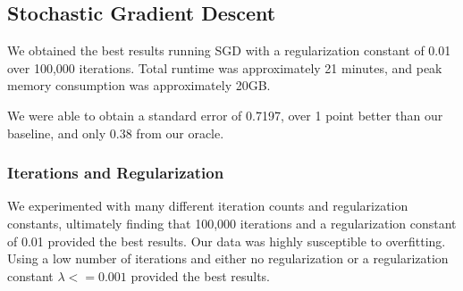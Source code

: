 \documentclass[journal]{IEEEtran}
\begin{document}
\subsection{Stochastic Gradient Descent}

We obtained the best results running SGD with a regularization constant of 0.01 over 100,000 iterations.  Total runtime was approximately 21 minutes, and peak memory consumption was approximately 20GB.
\\
\par We were able to obtain a standard error of 0.7197, over 1 point better than our baseline,
and only 0.38 from our oracle.
\\
\subsubsection{Iterations and Regularization}
We experimented with many different iteration counts and regularization constants, ultimately finding that 100,000 iterations and a regularization constant of 0.01 provided the best results.  Our data was highly susceptible to overfitting.  Using a low number of iterations and either no regularization or a regularization constant $ \lambda <= 0.001 $  provided the best results.

\end{document}
